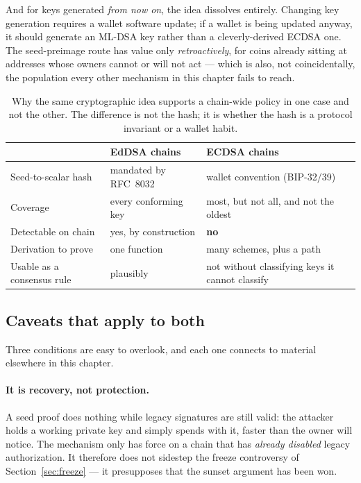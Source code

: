 And for keys generated \emph{from now on}, the idea dissolves entirely. Changing
key generation requires a wallet software update; if a wallet is being updated
anyway, it should generate an ML-DSA key rather than a cleverly-derived ECDSA
one. The seed-preimage route has value only \emph{retroactively}, for coins
already sitting at addresses whose owners cannot or will not act --- which is
also, not coincidentally, the population every other mechanism in this chapter
fails to reach.

\begin{table}[H]
\centering
\small
\begin{tabular}{@{}p{3.4cm}p{5.0cm}p{5.4cm}@{}}
\toprule
 & \textbf{EdDSA chains} & \textbf{ECDSA chains} \\
\midrule
Seed-to-scalar hash & mandated by RFC~8032 & wallet convention (BIP-32/39) \\
Coverage & every conforming key & most, but not all, and not the oldest \\
Detectable on chain & yes, by construction & \textbf{no} \\
Derivation to prove & one function & many schemes, plus a path \\
Usable as a consensus rule & plausibly & not without classifying keys it cannot classify \\
\bottomrule
\end{tabular}
\caption{Why the same cryptographic idea supports a chain-wide policy in one case
and not the other. The difference is not the hash; it is whether the hash is a
protocol invariant or a wallet habit.}
\label{tab:eddsa-ecdsa}
\end{table}

\subsection{Caveats that apply to both}
Three conditions are easy to overlook, and each one connects to material
elsewhere in this chapter.

\paragraph{It is recovery, not protection.}
A seed proof does nothing while legacy signatures are still valid: the attacker
holds a working private key and simply spends with it, faster than the owner will
notice. The mechanism only has force on a chain that has \emph{already disabled}
legacy authorization. It therefore does not sidestep the freeze controversy of
Section~\ref{sec:freeze} --- it presupposes that the sunset argument has been won.

